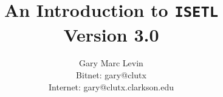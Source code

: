 


\newcommand{\ISETL}{{\tt ISETL\@}}
\newcommand{\SETL} {{\tt  SETL\@}}
\newcommand\twoup{
\topmargin	0.00in
\oddsidemargin	0.00in
\evensidemargin	0.00in
\headheight	0.25in
\headsep	0.20in
\textheight	6.50in
\pagestyle{headings}
}
\twoup

	\setcounter{secnumdepth}{3}	%
	\setcounter{tocdepth}{2}
	\pagestyle{headings}	%
	\newcommand{\XX}[1]{#1}	%
	\newcommand{\TT}[1]{\[#1\]}	%
	\makeindex

	\title{ An Introduction to \ISETL\\Version 3.0}	%
	\author{Gary Marc Levin \\
	Bitnet: gary@clutx\\	%
	Internet: gary@clutx.clarkson.edu	%
	}	%

	\newcommand{\DS}{\begin{center}\begin{minipage}{10in}\tt\begin{tabbing}}	%
	\newcommand{\DE}{\end{tabbing}\end{minipage}\end{center}}	%
	
	\newcommand{\CS}{\begin{center}}	%
	\newcommand{\CE}{\end{center}}	%
	




\renewcommand{\[}{\begingroup \tt\obeyspaces}
\renewcommand{\]}{\endgroup}
\renewcommand\div{\mskip-\medmuskip\mkern5mu
  \mathbin{\rm div}\penalty900\mkern5mu\mskip-\medmuskip}
\newcommand\mod{\mskip-\medmuskip\mkern5mu
  \mathbin{\rm mod}\penalty900\mkern5mu\mskip-\medmuskip}
\newcommand{\esc}{\mbox{$\backslash$}}
\newcommand{\caret}{\mbox{\^\,}}

